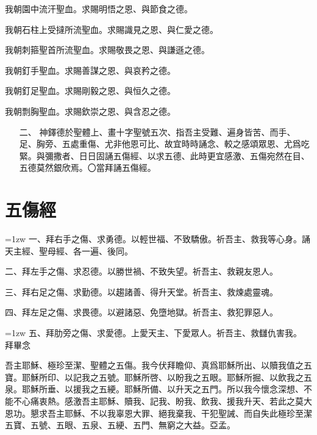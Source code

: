 我朝園中流汗聖血。求賜明悟之恩、與節食之德。

我朝石柱上受撻所流聖血。求賜識見之恩、與仁愛之德。

我朝刺箍聖首所流聖血。求賜敬畏之恩、與謙遜之德。

我朝釘手聖血。求賜善謀之恩、與哀矜之德。

我朝釘足聖血。求賜剛毅之恩、與恒久之德。

我朝剽胸聖血。求賜欽崇之恩、與含忍之德。

\begin{enumerate}
    \item[二、]{\small 神鐸德於聖體上、畫十字聖號五次、指吾主受難、遍身皆苦、而手、足、胸旁、五處重傷、尤非他恩可比、故宜時時誦念、較之感頌眾恩、尤爲吃緊。與彌撒者、日日固誦五傷經、以求五德、此時更宜感激、五傷宛然在目、五德莫然銀欣焉。〇當拜誦五傷經。}
\end{enumerate}
\section*{五傷經}
\hangindent=1zw 一、拜右手之傷、求勇德。以輕世福、不致驕傲。祈吾主、救我等心身。{\small 誦天主經、聖母經、各一遍、後同。}

二、拜左手之傷、求忍德。以勝世禍、不致失望。祈吾主、救親友恩人。

三、拜右足之傷、求勤德。以趨諸善、得升天堂。祈吾主、救煉處靈魂。

四、拜左足之傷、求畏德。以避諸惡、免墮地獄。祈吾主、救犯罪惡人。

\hangindent=1zw 五、拜肋旁之傷、求愛德。上愛天主、下愛眾人。祈吾主、救讎仇害我。 {\small 拜畢念}

吾主耶穌、極珍至潔、聖體之五傷。我今伏拜瞻仰、真爲耶穌所出、以贖我值之五寶。耶穌所印、以記我之五號。耶穌所啓、以盼我之五眼。耶穌所掘、以飲我之五泉。耶穌所垂、以援我之五綆。耶穌所備、以升天之五門。所以我今懷念深想、不能不心痛衷熱。感激吾主耶穌、贖我、記我、盼我、飲我、援我升天、若此之莫大恩功。懇求吾主耶穌、不以我辜恩大罪、絕我棄我、干犯聖誡、而自失此極珍至潔五寶、五號、五眼、五泉、五綆、五門、無窮之大益。{\cspace}亞孟。

